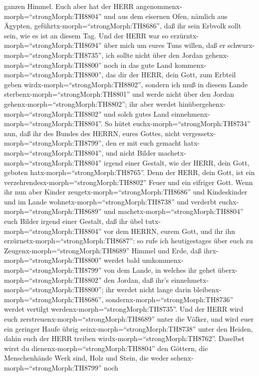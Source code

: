 ganzen Himmel.  Euch aber hat der HERR
angenommenx-morph=``strongMorph:TH8804'' und aus dem eisernen Ofen,
nämlich aus Ägypten, geführtx-morph=``strongMorph:TH8686'', daß ihr sein
Erbvolk sollt sein, wie es ist an diesem Tag.  Und der HERR
war so erzürntx-morph=``strongMorph:TH8694'' über mich um eures Tuns
willen, daß er schwurx-morph=``strongMorph:TH8735'', ich sollte nicht
über den Jordan gehenx-morph=``strongMorph:TH8800'' noch in das gute
Land kommenx-morph=``strongMorph:TH8800'', das dir der HERR, dein Gott,
zum Erbteil geben wirdx-morph=``strongMorph:TH8802'', 
sondern ich muß in diesem Lande sterbenx-morph=``strongMorph:TH8801''
und werde nicht über den Jordan gehenx-morph=``strongMorph:TH8802''; ihr
aber werdet hinübergehenx-morph=``strongMorph:TH8802'' und solch gutes
Land einnehmenx-morph=``strongMorph:TH8804''.  So hütet
euchx-morph=``strongMorph:TH8734'' nun, daß ihr des Bundes des HERRN,
eures Gottes, nicht vergessetx-morph=``strongMorph:TH8799'', den er mit
euch gemacht hatx-morph=``strongMorph:TH8804'', und nicht Bilder
machetx-morph=``strongMorph:TH8804'' irgend einer Gestalt, wie der HERR,
dein Gott, geboten hatx-morph=``strongMorph:TH8765''.  Denn
der HERR, dein Gott, ist ein verzehrendesx-morph=``strongMorph:TH8802''
Feuer und ein eifriger Gott.  Wenn ihr nun aber Kinder
zeugetx-morph=``strongMorph:TH8686'' und Kindeskinder und im Lande
wohnetx-morph=``strongMorph:TH8738'' und verderbt
euchx-morph=``strongMorph:TH8689'' und
machetx-morph=``strongMorph:TH8804'' euch Bilder irgend einer Gestalt,
daß ihr übel tutx-morph=``strongMorph:TH8804'' vor dem HERRN, eurem
Gott, und ihr ihn erzürnetx-morph=``strongMorph:TH8687'': 
so rufe ich heutigestages über euch zu
Zeugenx-morph=``strongMorph:TH8689'' Himmel und Erde, daß
ihrx-morph=``strongMorph:TH8800'' werdet bald
umkommenx-morph=``strongMorph:TH8799'' von dem Lande, in welches ihr
gehet überx-morph=``strongMorph:TH8802'' den Jordan, daß ihr's
einnehmetx-morph=``strongMorph:TH8800''; ihr werdet nicht lange darin
bleibenx-morph=``strongMorph:TH8686'',
sondernx-morph=``strongMorph:TH8736'' werdet vertilgt
werdenx-morph=``strongMorph:TH8735''.  Und der HERR wird
euch zerstreuenx-morph=``strongMorph:TH8689'' unter die Völker, und wird
euer ein geringer Haufe übrig seinx-morph=``strongMorph:TH8738'' unter
den Heiden, dahin euch der HERR treiben
wirdx-morph=``strongMorph:TH8762''.  Daselbst wirst du
dienenx-morph=``strongMorph:TH8804'' den Göttern, die Menschenhände Werk
sind, Holz und Stein, die weder sehenx-morph=``strongMorph:TH8799'' noch
